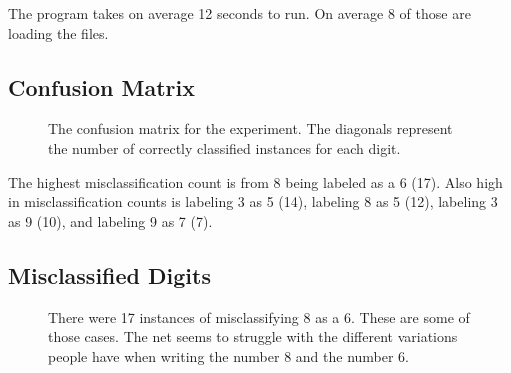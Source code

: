\documentclass[12pt,letterpaper]{report}
\begin{document}
The program takes on average 12 seconds to run. On average 8 of those are loading the files.
    
    \subsection{Confusion Matrix}
    	
    \begin{figure}[H]
   	\centering
    \caption{The confusion matrix for the experiment. The diagonals represent the number of correctly classified instances for each digit.}
    \end{figure}
    The highest misclassification count is from 8 being labeled as a 6 (17). Also high in misclassification counts is labeling 3 as 5 (14), labeling 8 as 5 (12), labeling 3 as 9 (10), and labeling 9 as 7 (7).
    
    \subsection{Misclassified Digits}
    \begin{figure}[H]
   	\centering
    \caption{There were 17 instances of misclassifying 8 as a 6. These are some of those cases. The net seems to struggle with the different variations people have when writing the number 8 and the number 6.}
    \end{figure}
    
\end{document}
